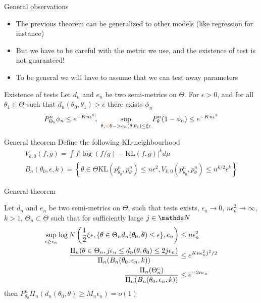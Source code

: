 

\begin{frame}{General observations}

\begin{itemize}[<+->]
\item The previous theorem can be generalized to other models (like regression for instance)
\item But we have to be careful with the metric we use, and the existence of test is not guaranteed! 
\item To be general we will have to assume that we can test away parameters
\end{itemize}
\pause 
\begin{block}{Existence of tests}
Let $d_n$ and $e_n$ be two semi-metrics on $\Theta$. For $\epsilon >0$, and for all $\theta_1 \in \Theta$ such that \alert<6->{$d_n(\theta_0,\theta_1)> \epsilon$} there exists $\phi_n$ 
$$
P_{\Theta_0}^n  \phi_n \leq e^{-Kn\epsilon^2}, ~ \sup_{\theta, \alert<6->{e_n(\theta,\theta_1)\leq \xi \epsilon}} P_{\theta}^n (1-\phi_n) \leq e^{-Kn\epsilon^2}
$$
\end{block}

\end{frame}

\begin{frame}{General theorem}
Define the following KL-neighbourhood 
\begin{align*}
V_{k,0}(f,g) = \int f|\log(f/g) - \text{KL}(f,g)|^k d\mu \\ 
B_n(\theta_0,\epsilon,k) = \left\{ \theta \in \Theta \text{KL}(p^n_{\theta_0},p^n_\theta)\leq n\epsilon^2, V_{k,0}(p_{\theta_0}^n, p^n_\theta) \leq n^{k/2}\epsilon^k \right\}
\end{align*}

\end{frame}
\begin{frame}{General theorem}
\begin{theorem}
Let $d_n$ and $e_n$ be two semi-metrics on $\Theta$, such that tests exists, $\epsilon_n\to 0 $, $n\epsilon_n^2 \to \infty$, $k>1$, $\Theta_n \subset \Theta$ such that for sufficiently large $j\in \N$ 
\begin{align*}
\sup_{\epsilon \geq \epsilon_n} \log N\left( \frac{1}{2} \xi \epsilon, \{\theta \in \Theta_n d_n(\theta_0,\theta)\leq \epsilon \}, e_n  \right) &\leq n\epsilon_n^2\\ 
{\Pi_n(\theta \in \Theta_n, j\epsilon_n \leq d_n(\theta,\theta_0)\leq 2j\epsilon_n) \over \Pi_n(B_n(\theta_0,\epsilon_n,k))} &\leq e^{Kn\epsilon_n^2j^2/2}\\ 
{\Pi_n(\Theta_n^c) \over \Pi_n(B_n(\theta_0,\epsilon_n,k))} & \leq e^{-2n\epsilon_n}
\end{align*}
then $P_{\theta_0}^n \Pi_n(d_n(\theta_0,\theta)\geq M_n \epsilon_n) = o(1)$
\end{theorem}
\end{frame}

